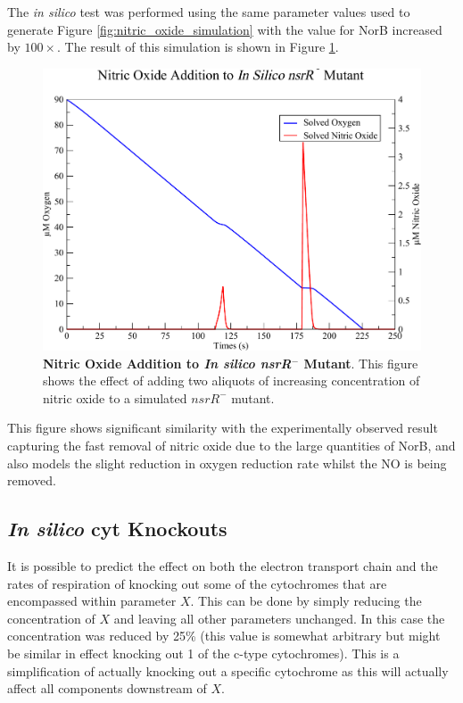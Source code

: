 The \textit{in silico} test was performed using the same parameter values used to generate Figure \ref{fig:nitric_oxide_simulation} with the value for NorB increased by $100\times$. The result of this simulation is shown in Figure \ref{fig:in_silico_nsrR}.
\begin{figure}[tbp]
 \centering
 \includegraphics[width=15cm, clip=true]{./09-completedmodel/data/in_silico_nsrR.pdf}
 \caption[Nitric Oxide Addition to In silico nsrR Mutant]{{\bf Nitric Oxide Addition to \textit{In silico nsrR}$^-$ Mutant}. This figure shows the effect of adding two aliquots of increasing concentration of nitric oxide to a simulated $nsrR^-$ mutant.
 \label{fig:in_silico_nsrR}}
\end{figure}
This figure shows significant similarity with the experimentally observed result capturing the fast removal of nitric oxide due to the large quantities of NorB, and also models the slight reduction in oxygen reduction rate whilst the NO is being removed.

\subsection{\textit{In silico} cyt Knockouts}
It is possible to predict the effect on both the electron transport chain and the rates of respiration of knocking out some of the cytochromes that are encompassed within parameter $X$. This can be done by simply reducing the concentration of $X$ and leaving all other parameters unchanged. In this case the concentration was reduced by 25\% (this value is somewhat arbitrary but might be similar in effect knocking out 1 of the c-type cytochromes). This is a simplification of actually knocking out a specific cytochrome as this will actually affect all components downstream of $X$.

